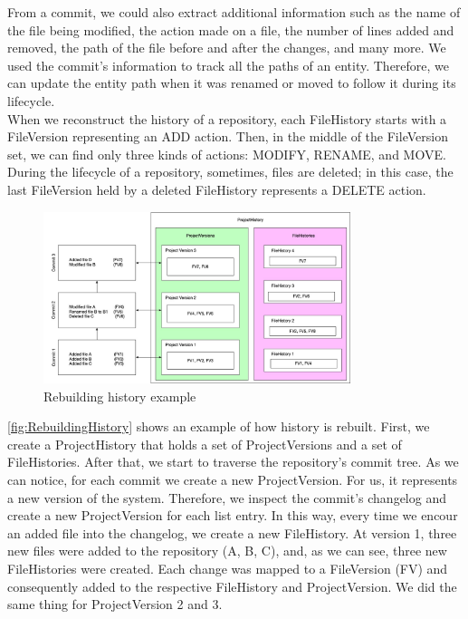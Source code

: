 From a commit, we could also extract additional information such as the name of the file being modified, the action made on a file, the number of lines added and removed, the path of the file before and after the changes, and many more.
We used the commit's information to track all the paths of an entity. Therefore, we can update the entity path when it was renamed or moved to follow it during its lifecycle. \\
\linebreak
When we reconstruct the history of a repository, each FileHistory starts with a FileVersion representing an ADD action. Then, in the middle of the FileVersion set, we can find only three kinds of actions: MODIFY, RENAME, and MOVE. 
During the lifecycle of a repository, sometimes, files are deleted; in this case, the last FileVersion held by a deleted FileHistory represents a DELETE action.
\bigbreak


\begin{figure}
    \begin{center}
        \includegraphics[width=0.8\textwidth]{RebuildingHistory.jpg}
    \end{center}
    \caption{Rebuilding history example}
    \label{fig:RebuildingHistory}
\end{figure}

\autoref{fig:RebuildingHistory} shows an example of how history is rebuilt.
First, we create a ProjectHistory that holds a set of ProjectVersions and a set of FileHistories.
After that, we start to traverse the repository's commit tree.
As we can notice, for each commit we create a new ProjectVersion. For us, it represents a new version of the system. 
Therefore, we inspect the commit's changelog and create a new ProjectVersion for each list entry.
In this way, every time we encour an added file into the changelog, we create a new FileHistory. 
At version 1, three new files were added to the repository (A, B, C), and, as we can see, three new FileHistories were created.
Each change was mapped to a FileVersion (FV) and consequently added to the respective FileHistory and ProjectVersion. 
We did the same thing for ProjectVersion 2 and 3. 

